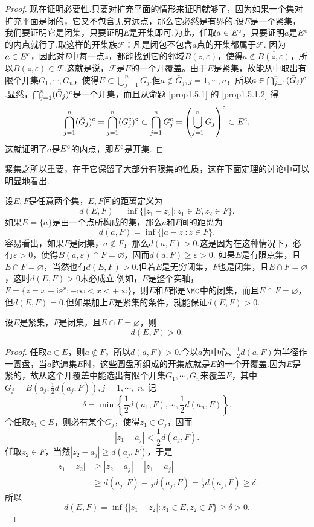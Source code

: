 \begin{proof}
现在证明必要性.只要对扩充平面的情形来证明就够了，因为如果一个集对扩充平面是闭的，它又不包含无穷远点，那么它必然是有界的.设$E$是一个紧集，我们要证明它是闭集，只要证明$E$是开集即可.为此，任取$a\in E^{\textrm c}$，只要证明$a$是$E^{\textrm c}$的内点就行了.取这样的开集族$\mathscr F$：凡是闭包不包含$a$点的开集都属于$\mathscr F$. 因为$a\in E^{\textrm c}$，因此对$E$中每一点$z$，都能找到它的邻域$B(z,\varepsilon)$，使得$a\notin \overline{B(z,\varepsilon)}$，所以$B(z,\varepsilon)\in\mathscr F$.这就是说，$\mathscr F$是$E$的一个开覆盖。由于$E$是紧集，故能从中取出有限个开集$G_1,\cdots,G_n$，使得$E\subset\bigcup_{j=1}^nG_j$.但$a\notin \bar G_j,j=1,\cdots,n$，所以$a\in\bigcap_{j=1}^n(\bar G_j)^{\textrm c}$.显然，$\bigcap_{j=1}^n(\bar G_j)^{\textrm c}$是一个开集，而且从命题 \ref{prop1.5.1} 的 \ref{prop1.5.1.2} 得
\[\bigcap_{j=1}^n(\bar G_j)^{\textrm c}=\bigcap_{j=1}^n(G_j^{\textrm c})^\circ\subset\bigcap_{j=1}^nG_j^{\textrm c}=\left(\bigcup_{j=1}^nG_j\right)^{\textrm c}\subset E^{\textrm c},\]
这就证明了$a$是$E^{\textrm c}$的内点，即$E^{\textrm c}$是开集.
\end{proof}

紧集之所以重要，在于它保留了大部分有限集的性质，这在下面定理的讨论中可以明显地看出.

设$E,F$是任意两个集，$E,F$间的距离定义为
\[d(E,F)=\inf \{|z_1-z_2|:z_1\in E,z_2\in F\}.\]
如果$E=\{a\}$是由一个点所构成的集，那么$a$和$F$间的距离为
\[d(a,F)=\inf \{|a-z|:z\in F\}.\]
容易看出，如果$F$是闭集，$a\notin F$，那么$d(a,F)>0$.这是因为在这种情况下，必有$\varepsilon>0$，使得$B(a,\varepsilon)\cap F=\varnothing$，因而$d(a,F)\ge\varepsilon>0$.
如果$E$是有限点集，且$E\cap F=\varnothing$，当然也有$d(E,F)>0$.但若$E$是无穷闭集，$F$也是闭集，且$E\cap F=\varnothing$，这时$d(E,F)>0$未必成立.例如，$E$是整个实轴，$F=\{z=x+\mathrm i\ee^x:-\infty<x<+\infty\}$，则$E$和$F$都是$\MC$中的闭集，而且$E\cap F=\varnothing$，但$d(E,F)=0$.但如果加上$E$是紧集的条件，就能保证$d(E,F)>0$.

\begin{theorem}\label{thm1.5.6}
设$E$是紧集，$F$是闭集，且$E\cap F=\varnothing$，则
\[d(E,F)>0.\]
\end{theorem}
\begin{proof}
任取$a\in E$，则$a\notin F$，所以$d(a,F)>0$.今以$a$为中心、$\frac12d(a,F)$为半径作一圆盘，当$a$跑遍集$E$时，这些圆盘所组成的开集族就是$E$的一个开覆盖.因为$E$是紧的，故从这个开覆盖中能选出有限个开集$G_1,\cdots,G_n$来覆盖$E$，其中$G_j=B\left(a_j,\frac12d(a_j,F)\right),j=1,\cdots,$ $n$. 记
\[\delta=\min\left\{\frac12d(a_1,F),\cdots,\frac12d(a_n,F)\right\}.\]
今任取$z_1\in E$，则必有某个$G_j$，使得$z_1\in G_j$，因而
\[|z_1-a_j|<\frac12d(a_j,F).\]
任取$z_2\in F$，当然$|z_2-a_j|\ge d(a_j,F)$，于是
\begin{align*}
  |z_1-z_2|&\ge|z_2-a_j|-|z_1-a_j|\\
           &\ge d(a_j,F)-\frac12d(a_j,F)=\frac12d(a_j,F)\ge\delta.
\end{align*}
所以
\[d(E,F)=\inf \{|z_1-z_2|:z_1\in E,z_2\in F\}\ge\delta>0.\]
\end{proof}

